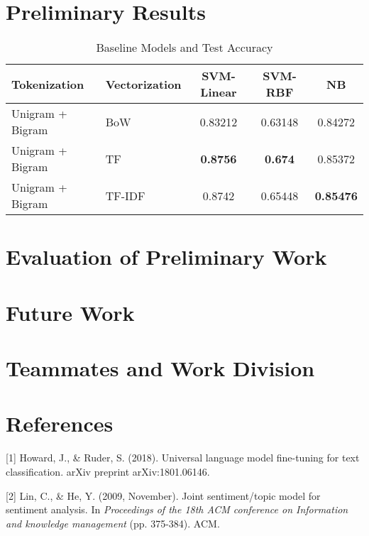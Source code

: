 \documentclass{article}
\begin{document}
\section{Preliminary Results}

\begin{table}
  \caption{Baseline Models and Test Accuracy}
  \label{baseline-result}
  \centering
  \begin{tabular}{ l l|| c | c | c} 
     \toprule
    Tokenization  & Vectorization & SVM-Linear & SVM-RBF & NB \\

    \midrule
    Unigram + Bigram & BoW  & 0.83212      & 0.63148    & 0.84272    \\
    Unigram + Bigram & TF & \textbf{0.8756}       & \textbf{0.674}     & 0.85372      \\
    Unigram + Bigram  & TF-IDF  & 0.8742      & 0.65448     & \textbf{0.85476}  \\
    \bottomrule
  \end{tabular}
\end{table}

\section{Evaluation of Preliminary Work}

\section{Future Work}

\section{Teammates and Work Division}

\section*{References}

\small


\hspace{\parindent} 

[1] Howard, J., & Ruder, S. (2018). Universal language model fine-tuning for text classification. arXiv preprint arXiv:1801.06146.

[2] Lin, C., & He, Y. (2009, November). Joint sentiment/topic model for sentiment analysis. In {\it Proceedings of the 18th ACM conference on Information and knowledge management} (pp. 375-384). ACM.
\end{document}
